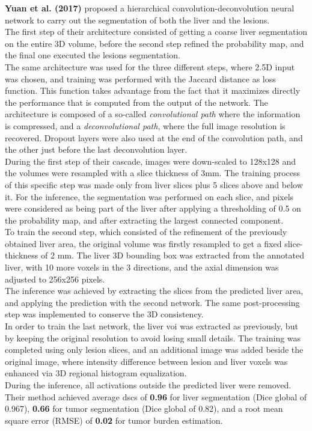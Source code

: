 \textbf{Yuan et al. (2017)} proposed a hierarchical
convolution-deconvolution neural network to carry out the segmentation
of both the liver and the lesions.\\
The first step of their architecture consisted of getting a coarse liver
segmentation on the entire 3D volume, before the second step refined the
probability map, and the final one executed the lesions segmentation.\\
The same architecture was used for the three different steps, where 2.5D
input was chosen, and training was performed with the Jaccard distance
as loss function. This function takes advantage from the fact that it
maximizes directly the performance that is computed from the output of
the network. The architecture is composed of a so-called
\emph{convolutional path} where the information is compressed, and a
\emph{deconvolutional path}, where the full image resolution is
recovered. Dropout layers were also used at the end of the convolution
path, and the other just before the last deconvolution layer.\\
During the first step of their cascade, images were down-scaled to
128x128 and the volumes were resampled with a slice thickness of 3mm.
The training process of this specific step was made only from liver
slices plus 5 slices above and below it. For the inference, the
segmentation was performed on each slice, and pixels were considered as
being part of the liver after applying a thresholding of 0.5 on the
probability map, and after extracting the largest connected component.\\
To train the second step, which consisted of the refinement of the
previously obtained liver area, the original volume was firstly
resampled to get a fixed slice-thickness of 2 mm. The liver 3D bounding
box was extracted from the annotated liver, with 10 more voxels in the 3
directions, and the axial dimension was adjusted to 256x256 pixels.\\
The inference was achieved by extracting the slices from the predicted
liver area, and applying the prediction with the second network. The
same post-processing step was implemented to conserve the 3D
consistency.\\
In order to train the last network, the liver \ac{voi} was extracted as
previously, but by keeping the original resolution to avoid losing small
details. The training was completed using only lesion slices, and an
additional image was added beside the original image, where intensity
difference between lesion and liver voxels was enhanced via 3D regional
histogram equalization.\\
During the inference, all activations outside the predicted liver were
removed.\\
Their method achieved average \ac{dsc}s of \textbf{0.96} for liver
segmentation (Dice global of 0.967), \textbf{0.66} for tumor
segmentation (Dice global of 0.82), and a root mean square error (RMSE)
of \textbf{0.02} for tumor burden estimation.

